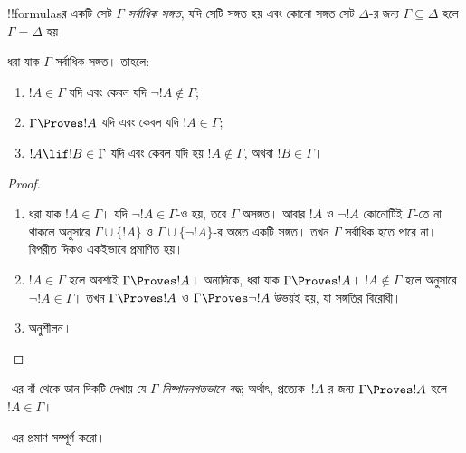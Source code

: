 \documentclass[../../../include/open-logic-section]{subfiles}
\begin{document}


\begin{defn}
!!{formula}sর একটি সেট $\Gamma$ \emph{সর্বাধিক সঙ্গত}, যদি সেটি
সঙ্গত হয় এবং কোনো সঙ্গত সেট $\Delta$-র জন্য $\Gamma
\subseteq \Delta$ হলে $\Gamma = \Delta$ হয়।
\end{defn}

\begin{lem}[সত্যতার সহায়ক উপপাদ্য]
ধরা যাক $\Gamma$ সর্বাধিক সঙ্গত। তাহলে:
\begin{enumerate}
\item {} $!A \in \Gamma$ যদি এবং কেবল যদি $\lnot !A
  \notin \Gamma$;
\item {} $\Gamma \Proves !A$ যদি এবং কেবল যদি $!A \in \Gamma$;
\item {} $!A \lif !B \in \Gamma$ যদি এবং কেবল যদি
  হয় $!A \notin \Gamma$, অথবা $!B \in \Gamma$।
\end{enumerate}
\end{lem}

\begin{proof}
\begin{enumerate}
\item ধরা যাক $!A \in \Gamma$। যদি $\lnot !A \in \Gamma$-ও হয়,
  তবে $\Gamma$ অসঙ্গত। আবার $!A$ ও $\lnot!A$ কোনোটিই
  $\Gamma$-তে না থাকলে 
  অনুসারে $\Gamma\cup\{!A\}$ ও $\Gamma \cup \{\lnot !A\}$-র
  অন্তত একটি সঙ্গত। তখন $\Gamma$ সর্বাধিক হতে পারে না।
  বিপরীত দিকও একইভাবে প্রমাণিত হয়।
\item $!A \in \Gamma$ হলে অবশ্যই $\Gamma \Proves !A$।
  অন্যদিকে, ধরা যাক $\Gamma \Proves !A$। $!A \notin \Gamma$ হলে
   অনুসারে $\lnot !A \in \Gamma$।
  তখন $\Gamma \Proves !A$ ও $\Gamma \Proves \lnot !A$ উভয়ই হয়,
  যা সঙ্গতির বিরোধী।
\item অনুশীলন।
\end{enumerate}
\end{proof}

-এর বাঁ-থেকে-ডান দিকটি দেখায় যে
$\Gamma$ \emph{নিষ্পাদনগতভাবে বদ্ধ}; অর্থাৎ, প্রত্যেক~$!A$-র জন্য
$\Gamma \Proves !A$ হলে $!A \in \Gamma$।

\begin{prob}
  -এর প্রমাণ সম্পূর্ণ করো।
\end{prob}
\end{document}

